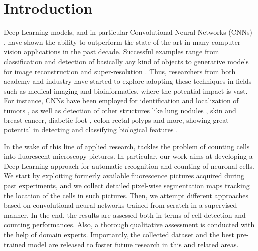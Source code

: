 \chapter{Introduction}
\label{chap:partI_intro}

Deep Learning models, and in particular Convolutional Neural Networks (CNNs) \cite{jimenez, greenspan}, have shown the ability to outperform the state-of-the-art in many computer vision applications in the past decade. 
Successful examples range from classification and detection of basically any kind of objects \cite{AlexNet, YOLO} to generative models for image reconstruction \cite{reconstruction} and super-resolution \cite{super-resolution}.
Thus, researchers from both academy and industry have started to explore adopting these techniques in fields such as medical imaging and bioinformatics, where the potential impact is vast.
For instance, CNNs have been employed for identification and localization of tumors \cite{brain_tumor,breast_cancer, ciresan2012deep, cirecsan2013mitosis}, as well as detection of other structures like lung nodules \cite{lung_nodules, meraj2020lung, su2021lung}, skin and breast cancer, diabetic foot \cite{TL_medical_imaging}, colon-rectal polyps \cite{korbar} and more, showing great potential in detecting and classifying biological features \cite{lundervold, sahiner, yadav}.

In the wake of this line of applied research,  tackles the problem of counting cells into fluorescent microscopy pictures.
In particular, our work aims at developing a Deep Learning approach for automatic recognition and counting of neuronal cells.
We start by exploiting formerly available fluorescence pictures acquired during past experiments, and we collect detailed pixel-wise segmentation maps tracking the location of the cells in such pictures.
Then, we attempt different approaches based on convolutional neural networks trained from scratch in a supervised manner.
In the end, the results are assessed both in terms of cell detection and counting performances. Also, a thorough qualitative assessment is conducted with the help of domain experts.
Importantly, the collected dataset and the best pre-trained model are released to foster future research in this and related areas. 

